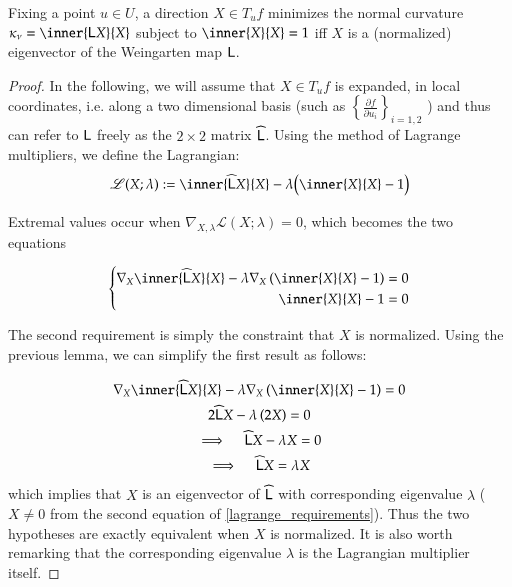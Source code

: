         \begin{theorem}
        	Fixing a point $u \in U$, a direction $X \in T_u f $ minimizes the normal curvature $\kappa_\nu = \inner{\wein X}{X}$ subject to $\inner{X}{X}= 1$
        	iff $X$ is a (normalized) eigenvector of the Weingarten map $\mathsf{L}$.
        	\end{theorem}
        \begin{proof}
        		
        		In the following, we will assume that $X \in T_u f$ is expanded,
        		in local coordinates, i.e. along  a two dimensional basis
        		(such as $\left\{ \frac{\partial f}{\partial u_i}\right\}_{i=1,2}$
        		) and thus can refer to $\mathsf{L}$ freely as the $2\times2$ matrix $\widehat{\mathsf{L}}$.
        		Using the method of Lagrange multipliers, we define the Lagrangian:
        		\begin{equation}
        		\mathscr{L}(X; \lambda) :=
	        	\inner{\weinmat X}{X} - \lambda\Big(\inner{X}{X} - 1\Big) 
	        \end{equation}
	        	
	        	Extremal values occur when
	        	$\nabla_{X,\lambda} \mathscr{L}(X;\lambda) = 0$,
	        	which becomes the two equations
	        	
	        \begin{equation} \label{lagrange_requirements}
	        \left\{ \begin{aligned}
		        \nabla_X \inner{\weinmat X}{X} - \lambda \nabla_X \left( \inner{X}{X} - 1 \right) = 0 \\
		        \inner{X}{X} - 1 = 0
	        \end{aligned} \right.
	        \end{equation}
	        
	        The second requirement is simply the constraint that $X$ is normalized.
	        Using the previous lemma, we can simplify the first result as follows:
	        
	        \begin{gather}
	        \nabla_X \inner{\weinmat X}{X} - \lambda \nabla_X \left( \inner{X}{X} - 1 \right) = 0 
	        \nonumber \\
	        2\weinmat X - \lambda \left(2 X \right) = 0  \nonumber \\
	        \implies \quad \weinmat X - \lambda X = 0 \nonumber \\
	        \implies \quad \weinmat X = \lambda X
	        \end{gather}
	        which implies that $X$ is an eigenvector of  $\widehat{\mathsf{L}}$ with corresponding eigenvalue $\lambda$ ($X\ne 0 $ from the second equation of \cref{lagrange_requirements}).
	        Thus the two hypotheses are exactly equivalent when $X$ is normalized. It is also worth remarking that the corresponding eigenvalue $\lambda$ is the Lagrangian multiplier itself.
        	\end{proof}
        	
